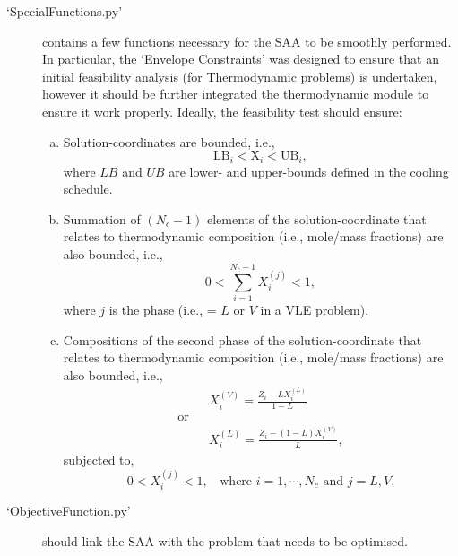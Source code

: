 \documentclass[14pt,twoside]{article}
\begin{document}
\begin{description}
      \item[`SpecialFunctions.py'] contains a few functions necessary for the SAA to be smoothly performed. In particular, the `Envelope$\_$Constraints' was designed to ensure that an initial feasibility analysis (for Thermodynamic problems) is undertaken, however it should be further integrated the thermodynamic module to ensure it work properly. Ideally, the feasibility test should ensure:
     \begin{enumerate}[a)]
         \item Solution-coordinates are bounded, i.e.,
                   \begin{displaymath}
                       \text{LB}_{i} <  \text{X}_{i}  <  \text{UB}_{i},
                   \end{displaymath}
               where $LB$ and $UB$ are lower- and upper-bounds defined in the cooling schedule. 

         \item Summation of $\left(N_{c} - 1 \right)$ elements of the solution-coordinate that relates to thermodynamic composition (i.e., mole/mass fractions) are also bounded, i.e.,
                   \begin{displaymath}
                       0 < \sum\limits_{i=1}^{N_{c}-1} X_{i}^{(j)} < 1,
                   \end{displaymath}
                where $j$ is the phase (i.e., = $L$ or $V$ in a VLE problem).

         \item Compositions of the second phase of the solution-coordinate that relates to thermodynamic composition (i.e., mole/mass fractions) are also bounded, i.e., 
              \begin{eqnarray}
                 && X_{i}^{(V)} = \frac{ Z_{i} - L X_{i}^{(L)}} { 1 - L } \nonumber \\
                      \text{or} && \nonumber \\ 
                 &&X_{i}^{(L)} = \frac{ Z_{i} - ( 1 - L ) X_{i}^{(V)} }{ L}, \nonumber
              \end{eqnarray}
        subjected to,
              \begin{displaymath}
                     0 < X_{i}^{(j)} < 1,\;\;\text{ where }i = 1, \cdots, N_{c} \text{ and }j = L,V.
              \end{displaymath}
     \end{enumerate}

      \item[`ObjectiveFunction.py'] should link the SAA with the problem that needs to be optimised.



\end{description}
\end{document}

